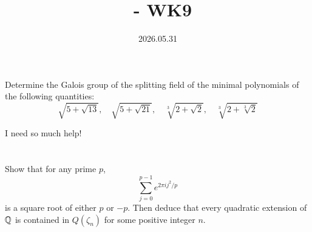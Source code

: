 \documentclass[12pt]{article}
\title{\course\ - WK9}
\author{\myname}
\date{2026.05.31}
\begin{document}
\maketitle
\thispagestyle{fancy}



\section{} 
Determine the Galois group of the splitting field of the minimal polynomials of the following quantities: 
$$\sqrt{5 + \sqrt{13}},\quad \sqrt{5 + \sqrt{21}},\quad \sqrt[3]{2 + \sqrt{2}}, \quad \sqrt[3]{2 + \sqrt[3]{2}}$$

\noindent \dotfill 

I need so much help! 

\section{} 

\subsection{}

Show that for any prime $p$, 
$$\sum_{j = 0}^{p - 1} e^{2\pi i j^2 / p}$$ 
is a square root of either $p$ or $-p$. 
Then deduce that every quadratic extension of $\mathbb{Q}$ is contained in $Q(\zeta_n)$ for some positive integer $n$. 

\noindent \dotfill 
\end{document}
